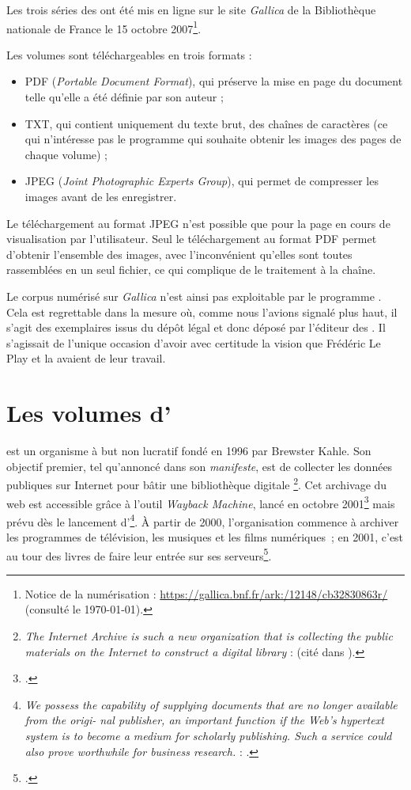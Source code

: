 Les trois séries des \odm{} ont été mis en ligne sur le site \textit{Gallica} de la Bibliothèque nationale de France le 15 octobre 2007\footnote{Notice de la numérisation : \url{https://gallica.bnf.fr/ark:/12148/cb32830863r/} (consulté le \today).}.

Les volumes sont téléchargeables en trois formats :

\begin{itemize}
    \item PDF (\textit{Portable Document Format}), qui préserve la mise en page du document telle qu'elle a été définie par son auteur ;
    \item TXT, qui contient uniquement du texte brut, \cad{} des chaînes de caractères (ce qui n'intéresse pas le programme \timeus qui souhaite obtenir les images des pages de chaque volume) ;
    \item JPEG (\textit{Joint Photographic Experts Group}), qui permet de compresser les images avant de les enregistrer.
\end{itemize}

Le téléchargement au format JPEG n'est possible que pour la page en cours de visualisation par l'utilisateur. Seul le téléchargement au format PDF permet d'obtenir l'ensemble des images, avec l'inconvénient qu'elles sont toutes rassemblées en un seul fichier, ce qui complique de le traitement à la chaîne.

Le corpus numérisé sur \textit{Gallica} n'est ainsi pas exploitable par le programme \timeus. Cela est regrettable dans la mesure où, comme nous l'avions signalé plus haut, il s'agit des exemplaires issus du dépôt légal et donc déposé par l'éditeur des \odm. Il s'agissait de l'unique occasion d'avoir avec certitude la vision que Frédéric Le Play et la \sess{} avaient de leur travail.

\section{Les volumes d'\ia}

\ia{} est un organisme à but non lucratif fondé en 1996 par Brewster Kahle. Son objectif premier, tel qu'annoncé dans son \textit{manifeste}, est de \og collecter les données publiques sur Internet pour bâtir une bibliothèque digitale \fg{}\footnote{\og \textit{The Internet Archive is such a new organization that is collecting the public materials on the Internet to construct a digital library} \fg{} : \cite{Brewster1} (cité dans \cite{Brewster2}).}. Cet archivage du web est accessible grâce à l'outil \textit{Wayback Machine}, lancé en octobre 2001\footcite[p.344]{panos} mais prévu dès le lancement d'\ia\footnote{\textit{We possess the capability of supplying documents that are no longer available from the origi- nal publisher, an important function if the Web’s hypertext system is to become a medium for scholarly publishing. Such a service could also prove worthwhile for business research.} : \cite[p.83]{iamanifest}.}. À partir de 2000, l'organisation commence à archiver les programmes de télévision, les musiques et les films numériques~; en 2001, c'est au tour des livres de faire leur entrée sur ses serveurs\footcite[p. 3-4]{Brewster2}.

